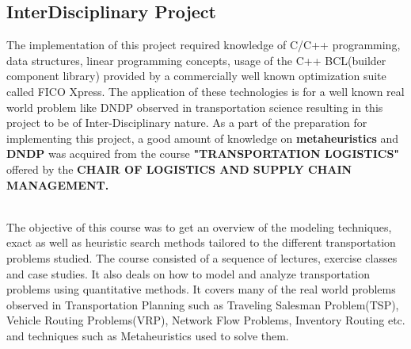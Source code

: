 \documentclass[a4paper, 12pt]{article}
\begin{document}
\subsection{InterDisciplinary Project}
The implementation of this project required knowledge of C/C++ programming, data structures, linear programming concepts, usage of the C++ BCL(builder component library) provided by a commercially well known optimization suite called FICO Xpress. The application of these technologies is for a well known real world problem like DNDP observed in transportation science resulting in this project to be of Inter-Disciplinary nature. As a part of the preparation for implementing this project, a good amount of knowledge on \textbf{metaheuristics} and \textbf{DNDP} was acquired from the course \textbf{"TRANSPORTATION LOGISTICS"} offered by the \textbf{CHAIR OF LOGISTICS AND SUPPLY CHAIN MANAGEMENT.}\par
\noindent
\\
The objective of this course was to get an overview of the modeling techniques, exact as well as heuristic search methods tailored to the different transportation problems studied. The course consisted of a sequence of lectures, exercise classes and case studies. It also deals on how to model and analyze transportation problems using quantitative methods. It covers many of the real world problems observed in Transportation Planning such as Traveling Salesman Problem(TSP), Vehicle Routing Problems(VRP), Network Flow Problems, Inventory Routing etc. and techniques such as Metaheuristics used to solve them.\par
\end{document}
